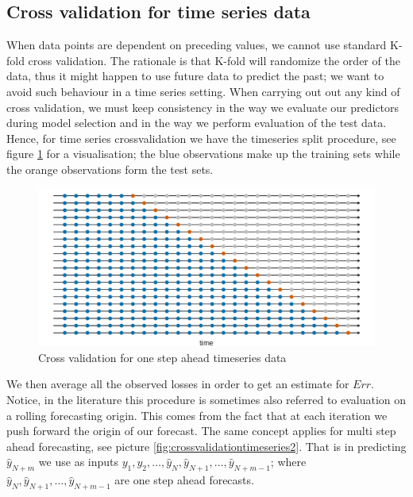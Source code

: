 \subsection{Cross validation for time series data}
When data points are dependent on preceding values, we cannot use standard K-fold cross validation. The rationale is that K-fold will randomize the order of the data, thus it might happen to use future data to predict the past; we want to avoid such behaviour in a time series setting. 
When carrying out out any kind of cross validation, we must keep consistency in the way we evaluate our predictors during model selection and in the way we perform evaluation of the test data.
Hence, for time series crossvalidation we have the timeseries split procedure, see figure \ref{fig:crossvalidationtimeseries} for a visualisation; the blue observations make up the training sets while the orange observations form the test sets.
\begin{figure}
    \includegraphics[width=\textwidth]{images/crossvalidationtimeseries.png}
    \caption{Cross validation for one step ahead timeseries data \cite{hyndman2018forecasting}}
    \label{fig:crossvalidationtimeseries}
\end{figure}
We then average all the observed losses in order to get an estimate for $Err$.
Notice, in the literature this procedure is sometimes also referred to evaluation on a rolling forecasting origin. This comes from the fact that at each iteration we push forward the origin of our forecast.
The same concept applies for multi step ahead forecasting, see picture \ref{fig:crossvalidationtimeseries2}.
That is in predicting $\hat{y}_{N+m}$ we use as inputs $y_1, y_2, \dots, \hat{y}_{N},\hat{y}_{N+1},\dots, \hat{y}_{N+m-1}$; where $\hat{y}_{N},\hat{y}_{N+1},\dots, \hat{y}_{N+m-1}$ are one step ahead forecasts.
